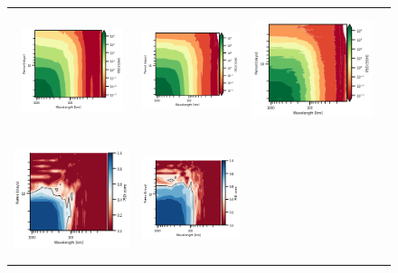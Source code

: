 \begin{figure}[t!]
\begin{center}
\begin{tabular}{cccc}
\includegraphics[trim={14mm 0 23mm 0},clip, width=3cm,height=3.5cm]{content/figures/fourdvarnet_figs/osse_gf_nadirswot_psd_spacetime.png} &
\hspace{-5mm}\includegraphics[trim={14mm 0 23mm 0},clip, width=3cm,height=3.5cm]{content/figures/fourdvarnet_figs/osse_gf_nadir_sst_psd_spacetime.png} &
\hspace{-5mm}\includegraphics[trim={14mm 0 0 0},clip,width=3.8cm,height=3.5cm]{content/figures/fourdvarnet_figs/ose_gf_psd_spacetime.png} \\
\hspace{-4mm}\includegraphics[trim={0 0 23mm 0},clip, width=3.70cm,height=3.5cm]{content/figures/fourdvarnet_figs/osse_gf_nadir_psd_spacetime_score.png} &
\hspace{-2mm}\includegraphics[trim={13mm 0 23mm 0},clip, width=3.1cm,height=3.5cm]{content/figures/fourdvarnet_figs/osse_gf_nadirswot_psd_spacetime_score.png} &

\end{tabular}
\end{center}
\end{figure}
